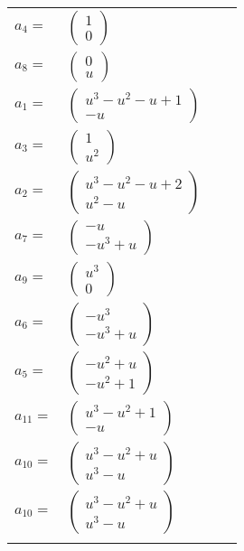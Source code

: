 \documentclass[1p]{elsarticle_modified}
\theoremstyle{definition}
\begin{document}
\begin{tabular}{m{7pt} m{180pt} m{7pt} m{180pt} }
\flushright $a_{4}=$&$\begin{pmatrix}1\\0\end{pmatrix}$ \\
\flushright $a_{8}=$&$\begin{pmatrix}0\\u\end{pmatrix}$ \\
\flushright $a_{1}=$&$\begin{pmatrix}u^3- u^2- u+1\\- u\end{pmatrix}$ \\
\flushright $a_{3}=$&$\begin{pmatrix}1\\u^2\end{pmatrix}$ \\
\flushright $a_{2}=$&$\begin{pmatrix}u^3- u^2- u+2\\u^2- u\end{pmatrix}$ \\
\flushright $a_{7}=$&$\begin{pmatrix}- u\\- u^3+u\end{pmatrix}$ \\
\flushright $a_{9}=$&$\begin{pmatrix}u^3\\0\end{pmatrix}$ \\
\flushright $a_{6}=$&$\begin{pmatrix}- u^3\\- u^3+u\end{pmatrix}$ \\
\flushright $a_{5}=$&$\begin{pmatrix}- u^2+u\\- u^2+1\end{pmatrix}$ \\
\flushright $a_{11}=$&$\begin{pmatrix}u^3- u^2+1\\- u\end{pmatrix}$ \\
\flushright $a_{10}=$&$\begin{pmatrix}u^3- u^2+u\\u^3- u\end{pmatrix}$\\ \flushright $a_{10}=$&$\begin{pmatrix}u^3- u^2+u\\u^3- u\end{pmatrix}$\\&\end{tabular}
\end{document}
